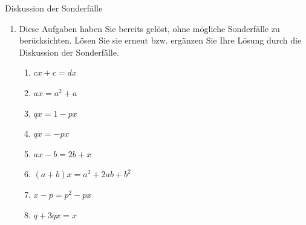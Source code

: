 \begin{ueb}
    {Diskussion der Sonderfälle}{}
    \begin{enumerate}
        \item Diese Aufgaben haben Sie bereits gelöst, ohne mögliche Sonderfälle zu berücksichten. Lösen Sie sie erneut bzw. ergänzen Sie Ihre Lösung durch die Diskussion der Sonderfälle.

              \begin{enumerate}
                  \item \(cx+c=dx\)
                  \item \(ax=a^2+a\)
                  \item \(qx=1-px\)
                  \item \(qx=-px\)
                  \item \(ax-b=2b+x\)
                  \item \((a+b)x=a^2+2ab+b^2\)
                  \item \(x-p=p^2-px\)
                  \item \(q+3qx=x\)
              \end{enumerate}
    \end{enumerate}
\end{ueb}

